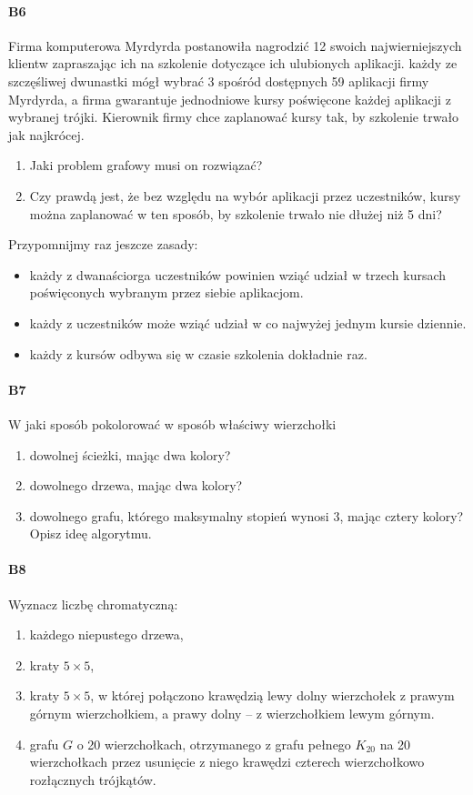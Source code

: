 \paragraph{B6} Firma komputerowa Myrdyrda postanowiła nagrodzić 12 swoich najwierniejszych klientw zapraszając
ich na szkolenie dotyczące ich ulubionych aplikacji. każdy ze szczęśliwej dwunastki mógł wybrać 3 spośród dostępnych 59 aplikacji firmy Myrdyrda, a firma gwarantuje jednodniowe kursy poświęcone każdej aplikacji
z wybranej trójki. Kierownik firmy chce zaplanować kursy tak, by szkolenie trwało jak najkrócej.
\begin{enumerate}[label=\alph*)]
\item Jaki problem grafowy musi on rozwiązać?
\item Czy prawdą jest, że bez względu na wybór aplikacji przez uczestników, kursy można zaplanować w ten sposób, by szkolenie trwało nie dłużej niż 5 dni?
\end{enumerate}
Przypomnijmy raz jeszcze zasady:
\begin{itemize}
\item każdy z dwanaściorga uczestników powinien wziąć udział w trzech kursach poświęconych wybranym przez siebie aplikacjom.
\item każdy z uczestników może wziąć udział w co najwyżej jednym kursie dziennie.
\item każdy z kursów odbywa się w czasie szkolenia dokładnie raz.
\end{itemize}

\paragraph{B7} W jaki sposób pokolorować w sposób właściwy wierzchołki
\begin{enumerate}[label=\alph*)]
\item dowolnej ścieżki, mając dwa kolory?
\item dowolnego drzewa, mając dwa kolory?
\item dowolnego grafu, którego maksymalny stopień wynosi 3, mając cztery kolory?
Opisz ideę algorytmu.
\end{enumerate}

\paragraph{B8} Wyznacz liczbę chromatyczną:
\begin{enumerate}[label=\alph*)]
\item każdego niepustego drzewa,
\item kraty $5 \times 5$,
\item  kraty $5 \times 5$, w której połączono krawędzią lewy dolny wierzchołek z prawym górnym wierzchołkiem, a prawy dolny – z wierzchołkiem lewym górnym.
\item  grafu $G$ o 20 wierzchołkach, otrzymanego z grafu pełnego $K_{20}$ na 20 wierzchołkach przez usunięcie z
niego krawędzi czterech wierzchołkowo rozłącznych trójkątów.
\end{enumerate}

